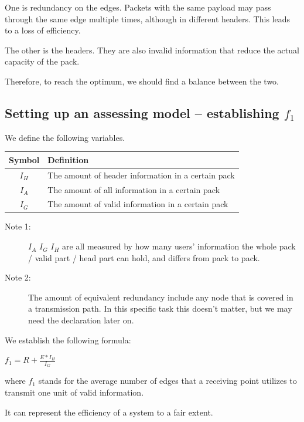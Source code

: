 \documentclass{mcmthesis}
\begin{document}
One is redundancy on the edges. Packets with the same payload may pass through the same edge multiple times, although in different headers. This leads to a loss of efficiency.

The other is the headers. They are also invalid information that reduce the actual capacity of the pack.

Therefore, to reach the optimum, we should find a balance between the two.

\subsection{Setting up an assessing model -- establishing $f_1$}

We define the following variables.

\begin{center}
	\begin{tabular}{cl}
		\hline
		Symbol  & Definition                                         \\
		\hline
		$I_{H}$ & The amount of header information in a certain pack \\
		$I_{A}$ & The amount of all information in a certain pack    \\
		$I_{G}$ & The amount of valid information in a certain pack  \\
		\hline
	\end{tabular}
\end{center}

\begin{description}
	\item [Note 1:] $I_{A}$ $I_{G}$ $I_{H}$ are all measured by how many users' information the whole pack / valid part / head part can hold, and differs from pack to pack.
	\item [Note 2:] The amount of equivalent redundancy include any node that is covered in a transmission path. In this specific task this doesn't matter, but we may need the declaration later on.
\end{description}

We establish the following formula:

\quad$f_1 = R+\frac{E*I_{H}}{I_{G}}$


where $f_1$ stands for the average number of edges that a receiving point utilizes to transmit one unit of valid information.



It can represent the efficiency of a system to a fair extent.
\end{document}
